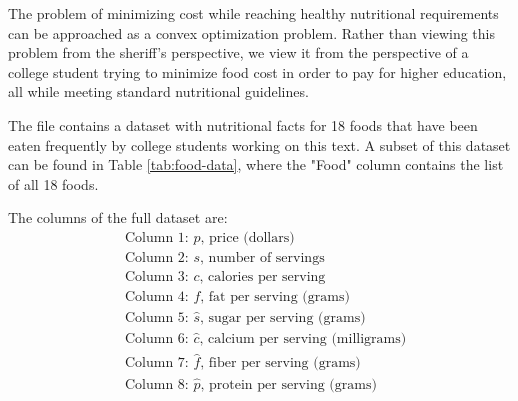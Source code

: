 The problem of minimizing cost while reaching healthy nutritional requirements can be approached as a convex optimization problem.
Rather than viewing this problem from the sheriff's perspective, we view it from the perspective of a college student trying to minimize food cost in order to pay for higher education, all while meeting standard nutritional guidelines.

The file  contains a dataset with nutritional facts for 18 foods that have been eaten frequently by college students working on this text.
A subset of this dataset can be found in Table \ref{tab:food-data}, where the "Food" column contains the list of all 18 foods.

The columns of the full dataset are:
\begin{align*}
& \text{Column 1: $p$, price (dollars)} \\
& \text{Column 2: $s$, number of servings} \\
& \text{Column 3: $c$, calories per serving} \\
& \text{Column 4: $f$, fat per serving (grams)} \\
& \text{Column 5: $\hat{s}$, sugar per serving (grams)} \\
& \text{Column 6: $\hat{c}$, calcium per serving (milligrams)} \\
& \text{Column 7: $\hat{f}$, fiber per serving (grams)} \\
& \text{Column 8: $\hat{p}$, protein per serving (grams)}
\end{align*}

